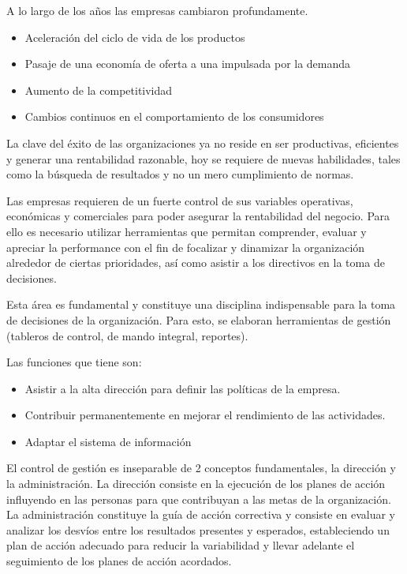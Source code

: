 \documentclass[titlepage,a4paper]{article}
\begin{document}
A lo largo de los años las empresas cambiaron profundamente.
\begin{itemize}
    \item Aceleración del ciclo de vida de los productos
    \item Pasaje de una economía de oferta a una impulsada por la demanda
    \item Aumento de la competitividad
    \item Cambios continuos en el comportamiento de los consumidores
\end{itemize}
La clave del éxito de las organizaciones ya no reside en ser productivas, eficientes y generar una
rentabilidad razonable, hoy se requiere de nuevas habilidades, tales como la búsqueda de resultados y no un mero cumplimiento de normas.

Las empresas requieren de un fuerte control de sus variables operativas, económicas y comerciales para
poder asegurar la rentabilidad del negocio. Para ello es necesario utilizar herramientas que permitan
comprender, evaluar y apreciar la performance con el fin de focalizar y dinamizar la organización alrededor
de ciertas prioridades, así como asistir a los directivos en la toma de decisiones. 

Esta área es fundamental y constituye una disciplina indispensable para la toma de decisiones de la organización. Para esto, se elaboran herramientas de gestión (tableros de control, de mando integral, reportes).

Las funciones que tiene son:
\begin{itemize}
    \item Asistir a la alta dirección para definir las políticas de la empresa.
    \item Contribuir permanentemente en mejorar el rendimiento de las actividades.
    \item Adaptar el sistema de información
\end{itemize}

El control de gestión es inseparable de 2 conceptos fundamentales, la dirección y la administración. La dirección consiste en la ejecución de los planes de acción influyendo en las personas para que contribuyan a las metas de la organización. La administración constituye la guía de acción correctiva y consiste en evaluar y analizar los desvíos entre los resultados presentes y esperados, estableciendo un plan de acción adecuado para reducir la variabilidad y llevar adelante el seguimiento de los planes de acción acordados.
\end{document}
